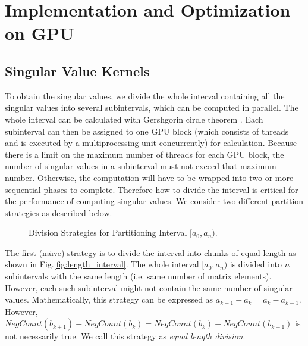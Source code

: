 \vspace{-0.1in}
\section{Implementation and Optimization on GPU} \label{sec:implementation}
\vspace{-0.1in}
\subsection{Singular Value Kernels} \label{sec_svalue}
\vspace{-0.1in}
To obtain the singular values, we divide the whole interval containing all the singular values into several subintervals, which can be computed in parallel. 
The whole interval can be calculated with Gershgorin circle theorem \cite{gershgorin}.
Each subinterval can then be assigned to one GPU block {\color{red}(which consists of threads and is executed by a multiprocessing unit concurrently)} for calculation.
Because there is a limit on the maximum number of threads for each GPU block,
the number of singular values in a subinterval must not exceed that maximum number. Otherwise, the computation will have to be wrapped into two or more sequential phases to complete.
Therefore how to divide the interval is critical for the performance of
computing singular values. We consider two different partition
strategies as described below. 
\begin{figure}[hbpt]
\vspace{-0.3in}
\centering
\vspace{-0.1in}
  \caption{Division Strategies for Partitioning Interval  $[a_0, a_n)$.}
\vspace{-0.3in}
\end{figure}

The first (na\"{\i}ve) strategy is to divide the interval into chunks of equal length as shown in Fig.\ref{fig:length_interval}.
The whole interval $[a_0, a_n)$ is divided into $n$ subintervals with
the same length (i.e. same number of matrix elements). However, each
such subinterval might not contain the same number of singular values.
Mathematically, this strategy can be expressed as
$a_{k+1}-a_k = a_{k}-a_{k-1}$. However, $NegCount(b_{k+1})-NegCount(b_{k}) = NegCount(b_{k})-NegCount(b_{k-1})$ is not necessarily true. We call this strategy as {\it equal length division}.

